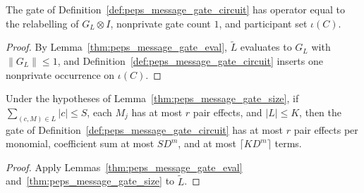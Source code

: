 \begin{lemma}
    \label{thm:peps_message_gate_circuit_properties}
    \leanok
    The gate of Definition~\ref{def:peps_message_gate_circuit} has operator
    equal to the relabelling of $G_L\otimes I$, nonprivate gate count $1$, and
    participant set $\iota(C)$.
\end{lemma}
\begin{proof}
    \leanok
    By Lemma~\ref{thm:peps_message_gate_eval}, $\widetilde L$ evaluates to
    $G_L$ with $\|G_L\|\le 1$, and Definition~\ref{def:peps_message_gate_circuit}
    inserts one nonprivate occurrence on $\iota(C)$.
\end{proof}

\begin{lemma}
    \label{thm:peps_message_gate_circuit_bounds}
    \leanok
    Under the hypotheses of Lemma~\ref{thm:peps_message_gate_size}, if
    $\sum_{(c,M)\in L}|c|\le S$, each $M_j$ has at most $r$ pair effects, and
    $|L|\le K$, then the gate of Definition~\ref{def:peps_message_gate_circuit}
    has at most $r$ pair effects per monomial, coefficient sum at most $SD^m$,
    and at most $\lceil KD^m\rceil$ terms.
\end{lemma}
\begin{proof}
    \leanok
    Apply Lemmas~\ref{thm:peps_message_gate_eval}
    and~\ref{thm:peps_message_gate_size} to $\widetilde L$.
\end{proof}
